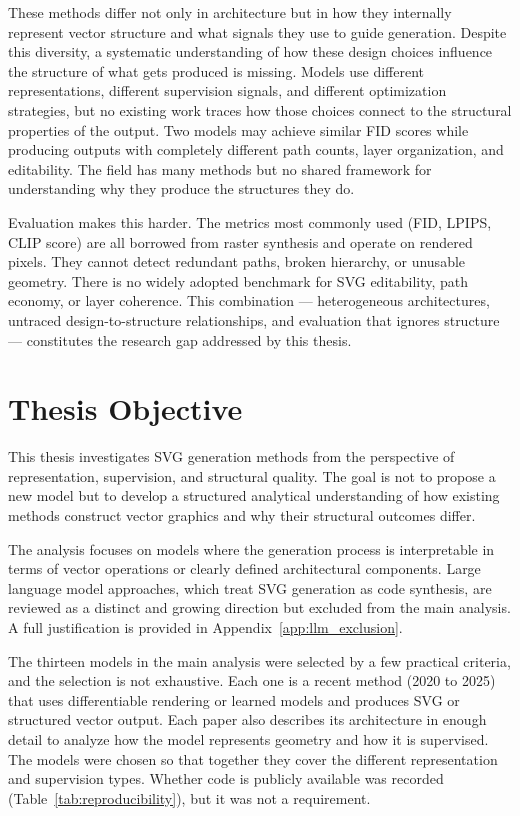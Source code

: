 These methods differ not only in architecture but in how they internally 
represent vector structure and what signals they use to guide generation.
Despite this diversity, a systematic understanding of how these design 
choices influence the structure of what gets produced is missing. 
Models use different representations, different supervision signals, 
and different optimization strategies, but no existing work traces 
how those choices connect to the structural properties of the output. 
Two models may achieve similar FID scores while producing outputs with 
completely different path counts, layer organization, and editability. 
The field has many methods but no shared framework for understanding why 
they produce the structures they do.

Evaluation makes this harder. The metrics most commonly used 
(FID, LPIPS, CLIP score) are all borrowed from raster synthesis and 
operate on rendered pixels. They cannot detect redundant paths, broken 
hierarchy, or unusable geometry. There is no widely adopted benchmark 
for SVG editability, path economy, or layer coherence.
This combination --- heterogeneous architectures, 
untraced design-to-structure relationships, and evaluation that ignores 
structure --- constitutes the research gap addressed by this thesis.

\section{Thesis Objective}
\label{sec:objective}

This thesis investigates SVG generation methods from 
the perspective of representation, supervision, and 
structural quality. The goal is not to propose a new 
model but to develop a structured analytical 
understanding of how existing methods construct vector 
graphics and why their structural outcomes differ.

The analysis focuses on models where the generation 
process is interpretable in terms of vector operations 
or clearly defined architectural components. Large 
language model approaches, which treat SVG generation 
as code synthesis, are reviewed as a distinct and 
growing direction but excluded from the main analysis. 
A full justification is 
provided in Appendix~\ref{app:llm_exclusion}.

The thirteen models in the main analysis were selected 
by a few practical criteria, and the selection is not 
exhaustive. Each one is a recent method (2020 to 2025) 
that uses differentiable rendering or learned models and 
produces SVG or structured vector output. Each paper also describes its architecture in 
enough detail to analyze how the model represents 
geometry and how it is supervised. The models were 
chosen so that together they cover the different 
representation and supervision types. Whether code is 
publicly available was recorded 
(Table~\ref{tab:reproducibility}), but it was not a 
requirement.


